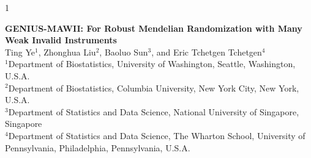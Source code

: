 \documentclass[12pt]{article}
\newcommand{\blind}{1}
\begin{document}
%
\newtheorem{prop}{Proposition}
\newtheorem{assum}{Assumption}
\newtheorem{theorem}{Theorem}
\newtheorem{lemma}{Lemma}





\def\spacingset#1{\renewcommand{\baselinestretch}%
{#1}\small\normalsize} \spacingset{1}

\def\red{\color{red}}
\def\bmX{\bm{X}}
\def\bmZ{\bm{Z}}
\def\bmZrest{\bm{Z}_{-j}}
\def\bmz{\bm{z}}
\def\bmg{g}
\def\Ting{\color{red} Ting: }
\def\bbeta{{ \beta}}
\newcommand\E{\mathbb{E}}
\newcommand{\Ex}[1]{\mathbb{E}\!\left[#1\right]}
\def\cov{\mbox{Cov}}
\def\var{\mbox{Var}}
\def\red{\color{red}}
\def\zero{0}
\def\O{\bm O}
\def\bfalpha{\bm \alpha}
\def\bfbeta{ \beta}
\def\bfgamma{\bm \gamma}
\def\bfGamma{\bm \Gamma}
\def\bfeta{\bm \eta}
\def\bmx{\bm x}

\def\bmV{\bm{V}}
\def\bmQ{\bm Q}




\blind
{
	 \begin{center} 
	\spacingset{1.5} 	{\LARGE\bf  GENIUS-MAWII: For Robust Mendelian Randomization with Many Weak Invalid Instruments} \\ \bigskip \bigskip
		\spacingset{1} 
		{\large  Ting Ye$ ^1 $, Zhonghua Liu$ ^2 $, Baoluo Sun$ ^3 $, and  Eric Tchetgen Tchetgen$ ^4 $} \\ \bigskip
	{  $ ^1 $Department of Biostatistics, University of Washington, Seattle, Washington, U.S.A. \\
	$ ^2 $Department of Biostatistics, Columbia University, New York City, New York, U.S.A. \\
	$ ^3 $Department of Statistics and Data Science, National University of Singapore, Singapore\\
	 $ ^4 $Department of Statistics and Data Science, The Wharton School, University of Pennsylvania, Philadelphia, Pennsylvania, U.S.A. \\
}
	\end{center}
} \fi
\end{document}
